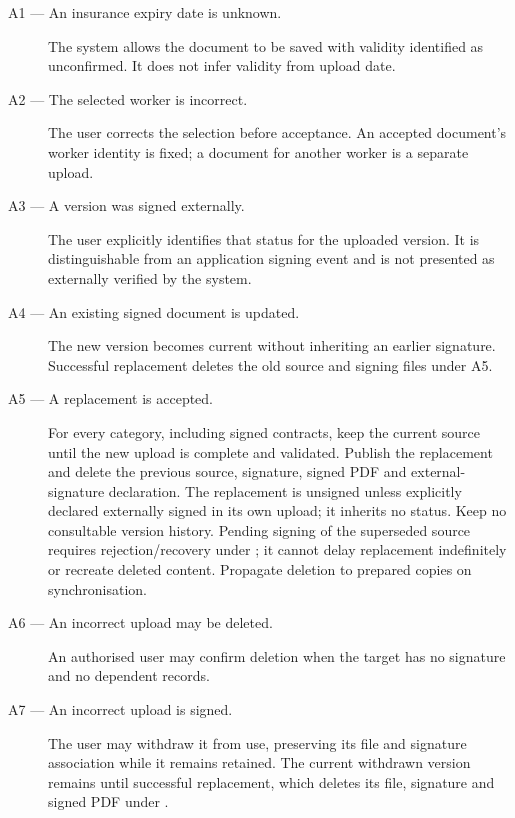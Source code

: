\begin{description}

    \item[A1 --- An insurance expiry date is unknown.]
    The system allows the document to be saved
    with validity identified as unconfirmed.
    It does not infer validity from upload date.

    \item[A2 --- The selected worker is incorrect.]
    The user corrects the selection before acceptance. An accepted document's
    worker identity is fixed; a document for another worker is a separate upload.

    \item[A3 --- A version was signed externally.]
    The user explicitly identifies that status
    for the uploaded version.
    It is distinguishable from an application
    signing event and is not presented
    as externally verified by the system.

    \item[A4 --- An existing signed document is updated.]
    The new version becomes current
    without inheriting an earlier signature.
    Successful replacement deletes the old source and signing files
    under A5.


    \item[A5 --- A replacement is accepted.]
    For every category, including signed contracts, keep the current source until
    the new upload is complete and validated. Publish the replacement and delete
    the previous source, signature, signed PDF and external-signature declaration.
    The replacement is unsigned unless explicitly declared externally signed in
    its own upload; it inherits no status. Keep no consultable version history.
    Pending signing of the superseded source requires rejection/recovery under
    ; it cannot delay replacement indefinitely or recreate
    deleted content. Propagate deletion to prepared copies on synchronisation.

    \item[A6 --- An incorrect upload may be deleted.]
    An authorised user may confirm deletion
    when the target has no signature
    and no dependent records.

    \item[A7 --- An incorrect upload is signed.]
    The user may withdraw it from use,
    preserving its file and signature association
    while it remains retained.
    The current withdrawn version remains until successful replacement, which deletes its file, signature and signed PDF under .


\end{description}
